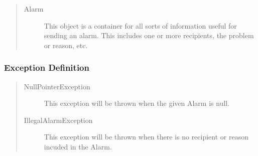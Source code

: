 \begin{quote}
	\begin{description}
		\item[Alarm] This object is a container for all sorts of information useful
		for sending an alarm. This includes one or more recipients, the problem or reason,
		etc.
	\end{description} 
\end{quote}

\subsubsection{Exception Definition} 

\begin{quote}
	\begin{description}
		\item[NullPointerException] This exception will be thrown when the given Alarm
		is null.
		\item[IllegalAlarmException] This exception will be thrown when there is no
		recipient or reason incuded in the Alarm.
	\end{description} 
\end{quote}
